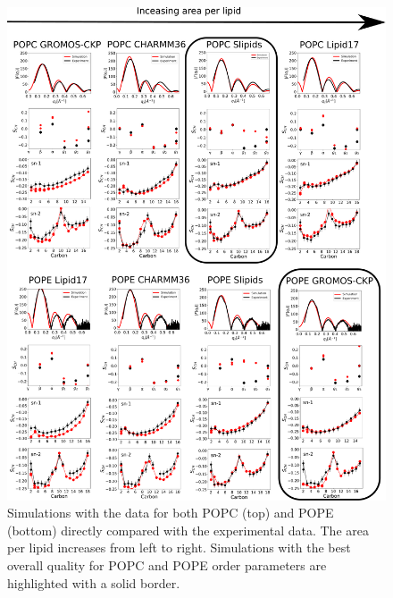\documentclass[fleqn,10pt]{wlscirepSI}
\begin{document}
\begin{figure}[!h]
    \centering
    \includegraphics[height = 0.9\textheight]{Figures/POPC_POPE_dataSI.pdf}
    \caption{Simulations with the data for both POPC (top) and POPE (bottom) directly compared with the experimental data. The area per lipid increases from left to right. Simulations with the best overall quality for POPC and POPE order parameters are highlighted with a solid border.
  }
    \label{fig:POPC_POPE_dataSI}
\end{figure}

\pagebreak
\end{document}
